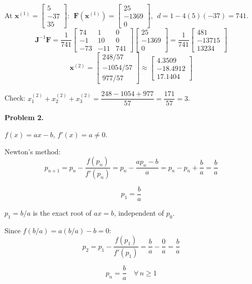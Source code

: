 \documentclass[12pt,letterpaper]{article}
\begin{document}
At $\mathbf{x}^{(1)} = \begin{bmatrix} 5 \\ -37 \\ 35 \end{bmatrix}$: $\;\mathbf{F}(\mathbf{x}^{(1)}) = \begin{bmatrix} 25 \\ -1369 \\ 0 \end{bmatrix}$, $\;d = 1 - 4(5)(-37) = 741$.
\[
\mathbf{J}^{-1}\mathbf{F} = \frac{1}{741}\begin{bmatrix} 74 & 1 & 0 \\ -1 & 10 & 0 \\ -73 & -11 & 741 \end{bmatrix}\begin{bmatrix} 25 \\ -1369 \\ 0 \end{bmatrix}
= \frac{1}{741}\begin{bmatrix} 481 \\ -13715 \\ 13234 \end{bmatrix}
\]
\[
\boxed{\mathbf{x}^{(2)} = \begin{bmatrix} 248/57 \\ -1054/57 \\ 977/57 \end{bmatrix} \approx \begin{bmatrix} 4.3509 \\ -18.4912 \\ 17.1404 \end{bmatrix}}
\]

Check: $x_1^{(2)} + x_2^{(2)} + x_3^{(2)} = \dfrac{248 - 1054 + 977}{57} = \dfrac{171}{57} = 3$.



\textbf{Problem 2.}

$f(x) = ax - b$, \; $f'(x) = a \ne 0$.

Newton's method:
\[
p_{n+1} = p_n - \frac{f(p_n)}{f'(p_n)} = p_n - \frac{ap_n - b}{a} = p_n - p_n + \frac{b}{a} = \frac{b}{a}
\]

\[
\boxed{p_1 = \frac{b}{a}}
\]

$p_1 = b/a$ is the exact root of $ax = b$, independent of $p_0$.

Since $f(b/a) = a(b/a) - b = 0$:
\[
p_2 = p_1 - \frac{f(p_1)}{f'(p_1)} = \frac{b}{a} - \frac{0}{a} = \frac{b}{a}
\]

\[
\boxed{p_n = \frac{b}{a} \quad \forall\, n \ge 1}
\]
\end{document}
